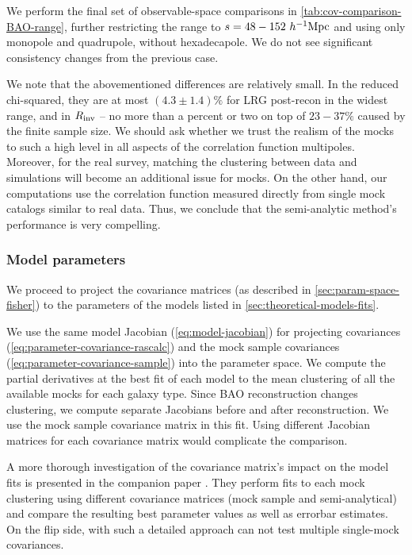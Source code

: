 We perform the final set of observable-space comparisons in \cref{tab:cov-comparison-BAO-range}, further restricting the range to $s=48-152~h^{-1}{\rm Mpc}$ and using only monopole and quadrupole, without hexadecapole.
We do not see significant consistency changes from the previous case.

We note that the abovementioned differences are relatively small.
In the reduced chi-squared, they are at most $(4.3 \pm 1.4)\%$ for LRG post-recon in the widest range, and in $R_{\rm inv}$ -- no more than a percent or two on top of $23-37\%$ caused by the finite sample size.
We should ask whether we trust the realism of the mocks to such a high level in all aspects of the correlation function multipoles.
Moreover, for the real survey, matching the clustering between data and simulations will become an additional issue for mocks.
On the other hand, our \rascalc{} computations use the correlation function measured directly from single mock catalogs similar to real data.
Thus, we conclude that the semi-analytic method's performance is very compelling.

\subsubsection{Model parameters}
\label{sec:cov-comparison-param}

We proceed to project the covariance matrices (as described in \cref{sec:param-space-fisher}) to the parameters of the models listed in \cref{sec:theoretical-models-fits}.

We use the same model Jacobian (\cref{eq:model-jacobian}) for projecting \rascalc{} covariances (\cref{eq:parameter-covariance-rascalc}) and the mock sample covariances (\cref{eq:parameter-covariance-sample}) into the parameter space.
We compute the partial derivatives at the best fit of each model to the mean clustering of all the available mocks for each galaxy type.
Since BAO reconstruction changes clustering, we compute separate Jacobians before and after reconstruction.
We use the mock sample covariance matrix in this fit.
Using different Jacobian matrices for each covariance matrix would complicate the comparison.

A more thorough investigation of the covariance matrix's impact on the model fits is presented in the companion paper \citep{KP4s6-Forero-Sanchez}.
They perform fits to each mock clustering using different covariance matrices (mock sample and semi-analytical) and compare the resulting best parameter values as well as errorbar estimates.
On the flip side, with such a detailed approach \cite{KP4s6-Forero-Sanchez} can not test multiple \rascalc{} single-mock covariances.

